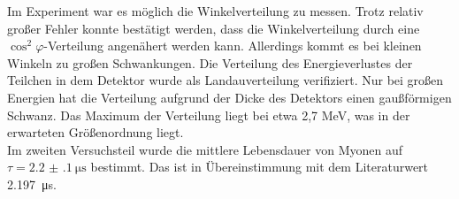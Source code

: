 Im Experiment war es möglich die Winkelverteilung zu messen. Trotz relativ großer Fehler konnte bestätigt werden, dass die Winkelverteilung durch eine $\cos^2{\varphi}$-Verteilung angenähert werden kann. Allerdings kommt es bei kleinen Winkeln zu großen Schwankungen. Die Verteilung des Energieverlustes der Teilchen in dem Detektor wurde als Landauverteilung verifiziert. Nur bei großen Energien hat die Verteilung aufgrund der Dicke des Detektors einen gaußförmigen Schwanz. Das Maximum der Verteilung liegt bei etwa 2,7 \si{\mega\eV}, was in der erwarteten Größenordnung liegt.\\

Im zweiten Versuchsteil wurde die mittlere Lebensdauer von Myonen auf $\tau = \SI[separate-uncertainty = true]{2.2(1)}{\micro\second}$ bestimmt. Das ist in Übereinstimmung mit dem Literaturwert \SI{2.197}{\micro\second}\cite{pdg}.
